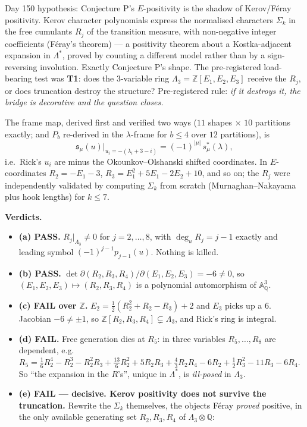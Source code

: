 \documentclass[11pt,a4paper]{article}
\newcommand{\Ztwo}{\mathbb{Z}}
\newcommand{\Q}{\mathbb{Q}}
\theoremstyle{plain}
\theoremstyle{definition}
\begin{document}
Day 150 hypothesis: Conjecture P's $E$-positivity is the shadow of Kerov/F\'eray
positivity. Kerov character polynomials express the normalised characters $\Sigma_k$ in the
free cumulants $R_j$ of the transition measure, with non-negative integer coefficients
(F\'eray's theorem) --- a positivity theorem about a Kostka-adjacent expansion in
$\Lambda^*$, proved by counting a different model rather than by a sign-reversing
involution. Exactly Conjecture P's shape. The pre-registered load-bearing test was
\textbf{T1}: does the $3$-variable ring $\Lambda_3=\Ztwo[E_1,E_2,E_3]$ receive the $R_j$,
or does truncation destroy the structure? Pre-registered rule: \emph{if it destroys it, the
bridge is decorative and the question closes.}

The frame map, derived first and verified two ways ($11$ shapes $\times$ $10$ partitions
exactly; and $P_b$ re-derived in the $\lambda$-frame for $b\le4$ over $12$ partitions), is
\[
\mathfrak s_\mu(u)\Big|_{u_i=-(\lambda_i+3-i)}=(-1)^{|\mu|}\,s^*_\mu(\lambda),
\]
i.e.\ Rick's $u_i$ are minus the Okounkov--Olshanski shifted coordinates. In $E$-coordinates
$R_2=-E_1-3$, $R_3=E_1^2+5E_1-2E_2+10$, and so on; the $R_j$ were independently validated by
computing $\Sigma_k$ from scratch (Murnaghan--Nakayama plus hook lengths) for $k\le7$.

\medskip
\noindent\textbf{Verdicts.}
\begin{itemize}
\item \textbf{(a) PASS.} $R_j|_{\Lambda_3}\neq0$ for $j=2,\dots,8$, with $\deg_uR_j=j-1$
exactly and leading symbol $(-1)^{j-1}p_{j-1}(u)$. Nothing is killed.
\item \textbf{(b) PASS.} $\det\partial(R_2,R_3,R_4)/\partial(E_1,E_2,E_3)=-6\neq0$, so
$(E_1,E_2,E_3)\mapsto(R_2,R_3,R_4)$ is a polynomial automorphism of $\mathbb A^3_\Q$.
\item \textbf{(c) FAIL over $\Ztwo$.} $E_2=\tfrac12(R_2^2+R_2-R_3)+2$ and $E_3$ picks up a
$6$. Jacobian $-6\neq\pm1$, so $\Ztwo[R_2,R_3,R_4]\subsetneq\Lambda_3$, and Rick's ring is
integral.
\item \textbf{(d) FAIL.} Free generation dies at $R_5$: in three variables
$R_5,\dots,R_8$ are dependent, e.g.
$R_5=\tfrac16R_2^4-R_2^3-R_2^2R_3+\tfrac{13}6R_2^2+5R_2R_3+\tfrac43R_2R_4-6R_2
+\tfrac12R_3^2-11R_3-6R_4$. So ``the expansion in the $R$'s'', unique in $\Lambda^*$, is
\emph{ill-posed} in $\Lambda_3$.
\item \textbf{(e) FAIL --- decisive. Kerov positivity does not survive the truncation.}
Rewrite the $\Sigma_k$ themselves, the objects F\'eray \emph{proved} positive, in the only
available generating set $R_2,R_3,R_4$ of $\Lambda_3\otimes\Q$:
\end{itemize}
\end{document}
